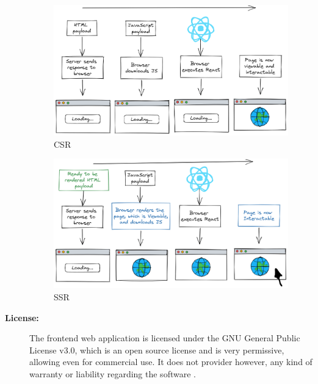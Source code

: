 \begin{description}
    \begin{figure}[!htb]
      \caption{\acl{CSR}}\label{fig:csr}
      \begin{center}
        \includegraphics[width=14cm]{img/6-csr.png}
      \end{center}
    \end{figure}

    \begin{figure}[!htb]
      \caption{\acl{SSR}}\label{fig:ssr}
      \begin{center}
        \includegraphics[width=14cm]{img/6-ssr.png}
      \end{center}
    \end{figure}
  \item[\textbf{License:}] The frontend web application is licensed under the GNU General Public License v3.0, which is an open source license and is very permissive, allowing even for commercial use. It does not provider however, any kind of warranty or liability regarding the software \cite{gnugpl3}.

\end{description}
